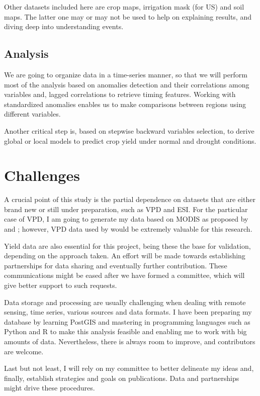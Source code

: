 \documentclass[hidelinks,12pt]{article}
\begin{document}
	Other datasets included here are crop maps, irrigation mask (for US) and soil maps. The latter one may or may not be used to help on explaining results, and diving deep into understanding events.
	
	\subsection{Analysis}
	We are going to organize data in a time-series manner, so that we will perform most of the analysis based on anomalies detection and their correlations among variables and, lagged correlations to retrieve timing features. Working with standardized anomalies enables us to make comparisons between regions using different variables.
	
	Another critical step is, based on stepwise backward variables selection, to derive global or local models to predict crop yield under normal and drought conditions. 

\section{Challenges}
	A crucial point of this study is the partial dependence on datasets that are either brand new or still under preparation, such as VPD and ESI. For the particular case of VPD, I am going to generate my  data based on MODIS as proposed by \cite{Hashimoto2008} and \cite{Zhang2014b}; however, VPD data used by \cite{Behrangi2016} would be extremely valuable for this research.
	
	Yield data are also essential for this project, being these the base for validation, depending on the approach taken. An effort will be made towards establishing partnerships for data sharing and eventually further contribution. These communications might be eased after we have formed a committee, which will give better support to such requests.
		
	Data storage and processing are usually challenging when dealing with remote sensing, time series, various sources and data formats. I have been preparing my database by learning PostGIS and mastering in programming languages such as Python and R to make this analysis feasible and enabling me to work with big amounts of data. Nevertheless, there is always room to improve, and contributors are welcome.  

	Last but not least, I will rely on my committee to better delineate my ideas and, finally, establish strategies and goals on publications. Data and partnerships might drive these procedures.
	



\end{document}
